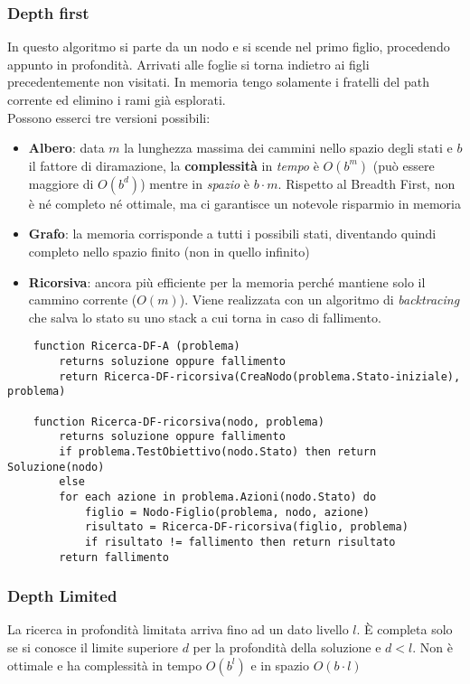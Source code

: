 \subsubsection{Depth first}
In questo algoritmo si parte da un nodo e si scende nel primo figlio, procedendo appunto in profondità. Arrivati alle foglie si torna indietro ai figli precedentemente non visitati. In memoria tengo solamente  i fratelli del path corrente ed elimino i rami già esplorati.\\  Possono esserci tre versioni possibili:
\begin{itemize}
	\item \textbf{Albero}: data $m$ la lunghezza massima dei cammini nello spazio degli stati e $b$ il fattore di diramazione, la \textbf{complessità} in \emph{tempo} è $O(b^m)$ (può essere maggiore di $O(b^d)$) mentre in \emph{spazio} è $b \cdot m$.
	Rispetto al Breadth First, non è né completo né ottimale, ma ci garantisce un notevole risparmio in memoria
	\item \textbf{Grafo}: la memoria corrisponde a tutti i possibili stati, diventando quindi completo nello spazio finito (non in quello infinito)
	\item \textbf{Ricorsiva}: ancora più efficiente per la memoria perché mantiene solo il cammino corrente ($O(m)$). Viene realizzata con un algoritmo di \emph{backtracing} che salva lo stato su uno stack a cui torna in caso di fallimento.
\end{itemize}
\newpage
\begin{lstlisting}
	function Ricerca-DF-A (problema)
		returns soluzione oppure fallimento
		return Ricerca-DF-ricorsiva(CreaNodo(problema.Stato-iniziale), problema)
	
	function Ricerca-DF-ricorsiva(nodo, problema)
		returns soluzione oppure fallimento
		if problema.TestObiettivo(nodo.Stato) then return Soluzione(nodo)
		else
		for each azione in problema.Azioni(nodo.Stato) do
			figlio = Nodo-Figlio(problema, nodo, azione)
			risultato = Ricerca-DF-ricorsiva(figlio, problema)
			if risultato != fallimento then return risultato
		return fallimento
\end{lstlisting}
\subsubsection{Depth Limited}
La ricerca in profondità limitata arriva fino ad un dato livello $l$. È completa solo se si conosce il limite superiore $d$ per la profondità della soluzione e $d<l$. Non è ottimale e ha complessità in tempo $O(b^l)$ e in spazio $O(b \cdot l)$

